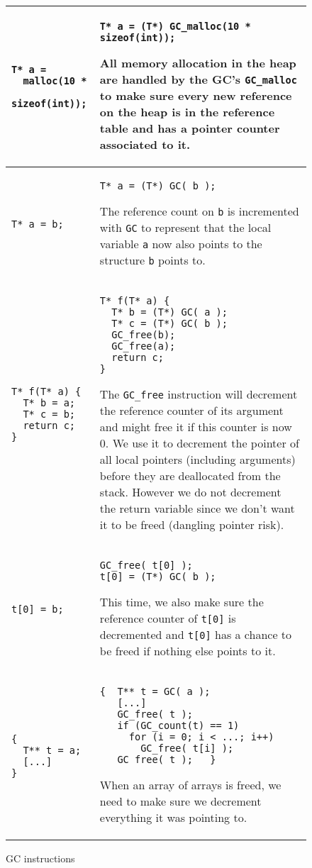 \documentclass[12pt,a4paper]{article}
\newcommand{\cl}[1]{\texttt{#1}}
\begin{document}
\begin{figure}[!ht]
\begin{tabular}{|p{3.6cm}|p{12.5cm}|}
\hline
\begin{lstlisting}
T* a =
  malloc(10 *
    sizeof(int));
\end{lstlisting} & \begin{lstlisting}
T* a = (T*) GC_malloc(10 * sizeof(int));
\end{lstlisting}
All memory allocation in the heap are handled by the GC's \cl{GC\_malloc} to make sure every new reference on the heap is in the reference table and has a pointer counter associated to it.
\\ \hline
\begin{lstlisting}
T* a = b;
\end{lstlisting} & \begin{lstlisting}
T* a = (T*) GC( b );
\end{lstlisting}
The reference count on \cl{b} is incremented with \cl{GC} to represent that the local variable \cl{a} now also points to the structure \cl{b} points to.\\ \hline
\begin{lstlisting}
T* f(T* a) {
  T* b = a;
  T* c = b;
  return c;
}
\end{lstlisting} & \begin{lstlisting}
T* f(T* a) {
  T* b = (T*) GC( a );
  T* c = (T*) GC( b );
  GC_free(b);
  GC_free(a);
  return c;
}
\end{lstlisting}
The \cl{GC\_free} instruction will decrement the reference counter of its argument and might free it if this counter is now 0. We use it to decrement the pointer of all local pointers (including arguments) before they are deallocated from the stack. However we do not decrement the return variable since we don't want it to be freed (dangling pointer risk). \\ \hline
\begin{lstlisting}
t[0] = b;
\end{lstlisting} & \begin{lstlisting}
GC_free( t[0] );
t[0] = (T*) GC( b );
\end{lstlisting}
This time, we also make sure the reference counter of \cl{t[0]} is decremented and \cl{t[0]} has a chance to be freed if nothing else points to it.\\ \hline
\begin{lstlisting}
{
  T** t = a;
  [...]
}
\end{lstlisting} & \begin{lstlisting}
{  T** t = GC( a );
   [...]
   GC_free( t );
   if (GC_count(t) == 1)
     for (i = 0; i < ...; i++)
       GC_free( t[i] );
   GC_free( t );   }
\end{lstlisting}
When an array of arrays is freed, we need to make sure we decrement everything it was pointing to. \\ \hline
\end{tabular}
\caption{GC instructions}
\label{fig:GCinstr}
\end{figure}
\end{document}
